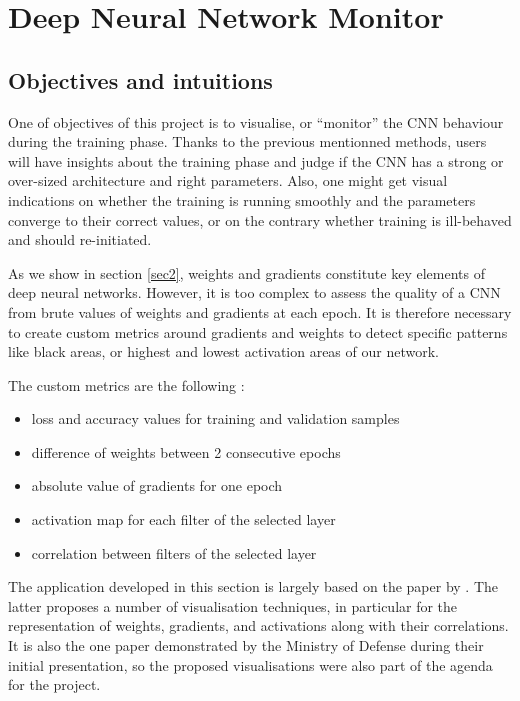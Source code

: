 \newpage

\section{Deep Neural Network Monitor}
\label{sec6}

\subsection{Objectives and intuitions}

One of objectives of this project is to visualise, or ``monitor'' the CNN behaviour during the training phase. Thanks to the previous mentionned methods, users will have insights about the training phase and judge if the CNN has a strong or over-sized architecture and right parameters. Also, one might get visual indications on whether the training is running smoothly and the parameters converge to their correct values, or on the contrary whether training is ill-behaved and should re-initiated.
 
As we show in section \ref{sec2}, weights and gradients constitute key elements of deep neural networks. However, it is too complex to assess the quality of a CNN from brute values of weights and gradients at each epoch. It is therefore necessary to create custom metrics around gradients and weights to detect specific patterns like black areas, or highest and lowest activation areas of our network.

The custom metrics are the following :
\begin{itemize}
    \item loss and accuracy values for training and validation samples
    \item difference of weights between 2 consecutive epochs
    \item absolute value of gradients for one epoch
	\item activation map for each filter of the selected layer
	\item correlation between filters of the selected layer
\end{itemize}

The application developed in this section is largely based on the paper by \cite{Chen2018}. The latter proposes a number of visualisation techniques, in particular for the representation of weights, gradients, and activations along with their correlations. It is also the one paper demonstrated by the Ministry of Defense during their initial presentation, so the proposed visualisations were also part of the agenda for the project.

